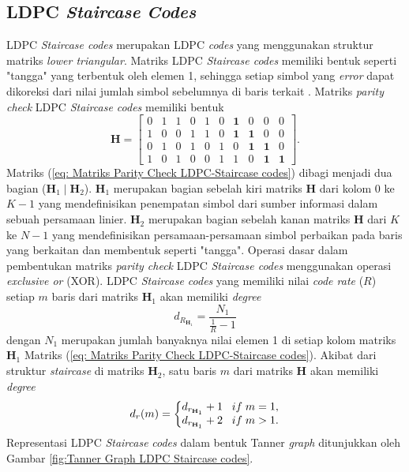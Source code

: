 \subsection{LDPC \textit{Staircase} \textit{Codes}}
LDPC \textit{Staircase codes} merupakan LDPC \textit{codes} yang menggunakan struktur matriks \textit{lower triangular}. Matriks LDPC \textit{Staircase codes} memiliki bentuk seperti "tangga" yang terbentuk oleh elemen 1, sehingga setiap simbol yang \textit{error} dapat dikoreksi dari nilai jumlah simbol sebelumnya di baris terkait \cite{staircase1}. Matriks \textit{parity check} LDPC \textit{Staircase codes} memiliki bentuk
\begin{equation}
\mathbf{H} = \begin{bmatrix} 
0 & 1 & 1 & 0 & 1 & 0 & \textbf{1} & 0 & 0 & 0  \\ 
1 & 0 & 0 & 1 & 1 & 0 & \textbf{1} & \textbf{1} & 0 & 0  \\ 
0 & 1 & 0 & 1 & 0 & 1 & 0 & \textbf{1} & \textbf{1} & 0  \\ 
1 & 0 & 1 & 0 & 0 & 1 & 1 & 0 & \textbf{1} & \textbf{1} 
\end{bmatrix}.
\label{eq: Matriks Parity Check LDPC-Staircase codes}
\end{equation} 
\noindent Matriks (\ref{eq: Matriks Parity Check LDPC-Staircase codes}) dibagi menjadi dua bagian ($\mathbf{H}_1 \mid \mathbf{H}_2$). $\mathbf{H}_1$ merupakan bagian sebelah kiri matriks $\mathbf{H}$ dari kolom $0$ ke $K-1$ yang mendefinisikan penempatan simbol dari sumber informasi dalam sebuah persamaan linier. $\mathbf{H}_2$ merupakan bagian sebelah kanan matriks $\mathbf{H}$ dari $K$ ke $N-1$ yang mendefinisikan persamaan-persamaan simbol perbaikan pada baris yang berkaitan dan membentuk seperti "tangga". Operasi dasar dalam pembentukan matriks \textit{parity check} LDPC \textit{Staircase codes} menggunakan operasi \textit{exclusive or} (XOR). LDPC \textit{Staircase codes} yang memiliki nilai \textit{code rate} ($R$) setiap $m$ baris dari matriks $\mathbf{H}_1$ akan memiliki \textit{degree}
\begin{equation}
d_{R_{\mathbf{H}_1}}= \frac{N_{1}}{\frac{1}{R}-1}
\label{eq: degree matriks H1}
\end{equation} 
\noindent dengan $N_{1}$ merupakan jumlah banyaknya nilai elemen 1 di setiap kolom matriks $\mathbf{H}_1$ Matriks (\ref{eq: Matriks Parity Check LDPC-Staircase codes}). Akibat dari struktur \textit{staircase} di matriks $\mathbf{H}_2$, satu baris $m$ dari matriks $\mathbf{H}$ akan memiliki \textit{degree}
\begin{equation}
d_{r}(m)=
\left\{\begin{matrix}
d_{r_{\mathbf{H}_1}}+1 \;\;\; if \; m=1,
\\ 
d_{r_{\mathbf{H}_1}}+2 \;\;\; if \; m>1 .
\end{matrix}\right.
\label{eq: degree matriks $H_{1}$}
\end{equation} 
Representasi LDPC \textit{Staircase} \textit{codes} dalam bentuk Tanner\textit{ graph} ditunjukkan oleh Gambar \ref{fig:Tanner Graph LDPC Staircase codes}.

